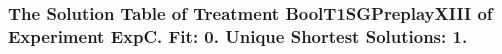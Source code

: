  \begin{frame}
 \fontsize{8pt}{9pt}\selectfont
 \frametitle{ The Solution Table of Treatment BoolT1SGPreplayXIII of Experiment ExpC. Fit: 0. Unique Shortest Solutions: 1. }

 \label{ExpCSolutionTable000.tex}  
 \end{frame}


